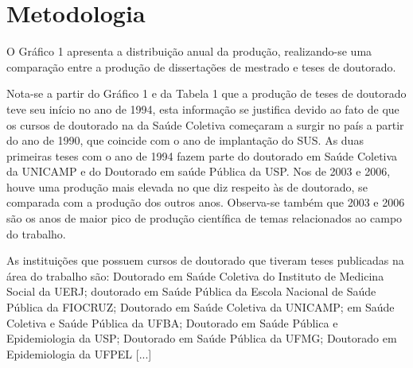 \chapter{Metodologia}
\label{chap:metodologia}

O Gráfico 1 apresenta a distribuição anual da produção, realizando-se uma comparação entre a produção de dissertações de mestrado e teses de doutorado.

    \begin{figure}[h!]
    	\centering
    \end{figure}

Nota-se a partir do Gráfico 1 e da Tabela 1 que a produção de teses de doutorado teve seu início no ano de 1994, esta informação se justifica devido ao fato de que os cursos de doutorado na  da Saúde Coletiva começaram a surgir no país a partir do ano de 1990, que coincide com o ano de implantação do SUS. As duas primeiras teses com o ano de 1994 fazem parte do doutorado em Saúde Coletiva da UNICAMP e do Doutorado em saúde Pública da USP. Nos  de 2003 e 2006, houve uma produção mais elevada no que diz respeito às  de doutorado, se comparada com a produção dos outros anos. Observa-se também que 2003 e 2006 são os anos de maior pico de produção científica de temas relacionados ao campo do trabalho.

As instituições que possuem cursos de doutorado que tiveram teses publicadas na área do trabalho são: Doutorado em Saúde Coletiva do Instituto de Medicina Social da UERJ; doutorado em Saúde Pública da Escola Nacional de Saúde Pública da FIOCRUZ; Doutorado em Saúde Coletiva da UNICAMP;  em Saúde Coletiva e Saúde Pública da UFBA; Doutorado em Saúde Pública e Epidemiologia da USP; Doutorado em Saúde Pública da UFMG; Doutorado em Epidemiologia da UFPEL [...]

